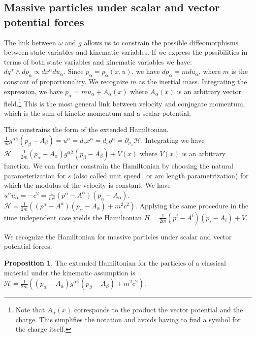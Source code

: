 \documentclass[smallextended]{svjour3}
\numberwithin{equation}{section}
\theoremstyle{definition}
\newtheorem{prop}[equation]{Proposition}
\begin{document}
\subsection{Massive particles under scalar and vector potential forces}

The link between $\omega$ and $g$ allows us to constrain the possible diffeomorphisms between state variables and kinematic variables. If we express the possibilities in terms of both state variables and kinematic variables we have: $dq^\alpha \wedge dp_\alpha \propto dx^\alpha du_\alpha$. Since  $p_\alpha=p_\alpha(x, u)$, we have $dp_\alpha = m du_\alpha$, where $m$ is the constant of proportionality. We recognize $m$ as the inertial mass. Integrating the expression, we have $p_\alpha = m u_\alpha + A_\alpha(x)$ where $A_\alpha(x)$ is an arbitrary vector field.\footnote{Note that $A_\alpha(x)$ corresponds to the product the vector potential and the charge. This simplifies the notation and avoids having to find a symbol for the charge itself.} This is the most general link between velocity and conjugate momentum, which is the sum of kinetic momentum and a scalar potential.

This constrains the form of the extended Hamiltonian. $\frac{1}{m}g^{\alpha\beta}(p_\beta-A_\beta) = u^\alpha = d_s x^\alpha = d_s q^\alpha = \partial_{p_\alpha} \mathcal{H}$. Integrating we have $\mathcal{H}=\frac{1}{2m}(p_\alpha-A_\alpha)g^{\alpha\beta}(p_\beta-A_\beta)+V(x)$ where $V(x)$ is an arbitrary function. We can further constrain the Hamiltonian by choosing the natural parameterization for $s$ (also called unit speed~\cite{Lee} or arc length parametrization) for which the modulus of the velocity is constant. We have $u^\alpha u_\alpha = - c^2 = \frac{1}{m^2}(p^\alpha-A^\alpha)(p_\alpha-A_\alpha)$. $\mathcal{H}=\frac{1}{2m}((p^\alpha-A^\alpha)(p_\alpha-A_\alpha) + m^2 c^2)$. Applying the same procedure in the time independent case yields the Hamiltonian $H=\frac{1}{2m}(p^i-A^i)(p_i-A_i)+V$.

We recognize the Hamiltonian for massive particles under scalar and vector potential forces.

\begin{prop}\label{prop:kinetic_hamiltonian}
The extended Hamiltonian for the particles of a classical material under the kinematic assumption is $\mathcal{H}=\frac{1}{2m}((p_\alpha-A_\alpha)g^{\alpha\beta}(p_\beta-A_\beta) + m^2 c^2)$.
\end{prop}
\end{document}
